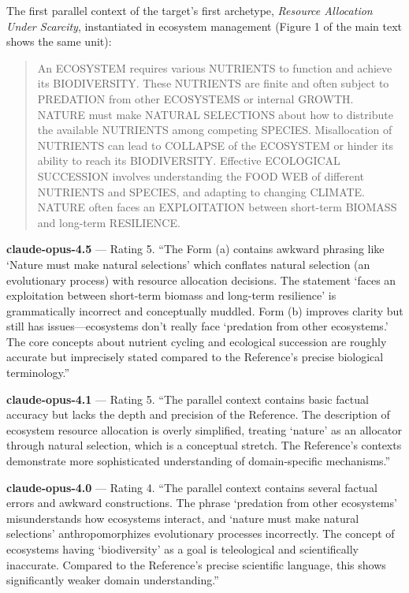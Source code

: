 \documentclass{article}
\begin{document}
The first parallel context of the target's first archetype, \emph{Resource Allocation Under Scarcity}, instantiated in ecosystem management (Figure 1 of the main text shows the same unit):

\begin{quote}
An ECOSYSTEM requires various NUTRIENTS to function and achieve its BIODIVERSITY. These NUTRIENTS are finite and often subject to PREDATION from other ECOSYSTEMS or internal GROWTH. NATURE must make NATURAL SELECTIONS about how to distribute the available NUTRIENTS among competing SPECIES. Misallocation of NUTRIENTS can lead to COLLAPSE of the ECOSYSTEM or hinder its ability to reach its BIODIVERSITY. Effective ECOLOGICAL SUCCESSION involves understanding the FOOD WEB of different NUTRIENTS and SPECIES, and adapting to changing CLIMATE. NATURE often faces an EXPLOITATION between short-term BIOMASS and long-term RESILIENCE.
\end{quote}

\textbf{claude-opus-4.5} --- Rating 5. ``The Form (a) contains awkward phrasing like `Nature must make natural selections' which conflates natural selection (an evolutionary process) with resource allocation decisions. The statement `faces an exploitation between short-term biomass and long-term resilience' is grammatically incorrect and conceptually muddled. Form (b) improves clarity but still has issues---ecosystems don't really face `predation from other ecosystems.' The core concepts about nutrient cycling and ecological succession are roughly accurate but imprecisely stated compared to the Reference's precise biological terminology.''

\textbf{claude-opus-4.1} --- Rating 5. ``The parallel context contains basic factual accuracy but lacks the depth and precision of the Reference. The description of ecosystem resource allocation is overly simplified, treating `nature' as an allocator through natural selection, which is a conceptual stretch. The Reference's contexts demonstrate more sophisticated understanding of domain-specific mechanisms.''

\textbf{claude-opus-4.0} --- Rating 4. ``The parallel context contains several factual errors and awkward constructions. The phrase `predation from other ecosystems' misunderstands how ecosystems interact, and `nature must make natural selections' anthropomorphizes evolutionary processes incorrectly. The concept of ecosystems having `biodiversity' as a goal is teleological and scientifically inaccurate. Compared to the Reference's precise scientific language, this shows significantly weaker domain understanding.''
\end{document}
